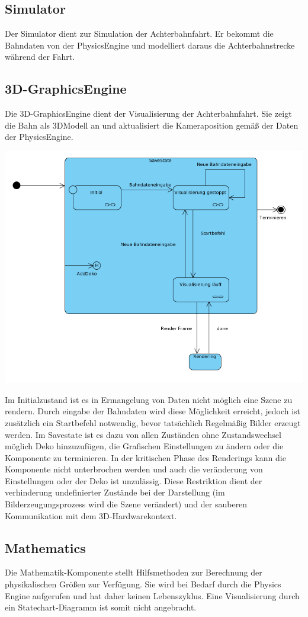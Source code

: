 \subsection{Simulator}
Der Simulator dient zur Simulation der Achterbahnfahrt. Er bekommt die Bahndaten von der PhysicsEngine und modelliert daraus die Achterbahnstrecke während der Fahrt.
\subsection{3D-GraphicsEngine}
Die 3D-GraphicsEngine dient der Visualisierung der Achterbahnfahrt. Sie zeigt die Bahn als 3DModell an und aktualisiert die Kameraposition gemäß der Daten der PhysicsEngine. 


\includegraphics[width=16cm]{bilder/statechart_3dgraphics}

Im Initialzustand ist es in Ermangelung von Daten nicht möglich eine Szene zu rendern. Durch eingabe der Bahndaten wird diese Möglichkeit erreicht, jedoch ist zusätzlich ein Startbefehl notwendig,
bevor tatsächlich Regelmäßig Bilder erzeugt werden. Im Savestate ist es dazu von allen Zuständen ohne Zustandswechsel möglich Deko hinzuzufügen, die Grafischen Einstellungen zu ändern oder die Komponente zu terminieren.
In der kritischen Phase des Renderings kann die Komponente nicht unterbrochen werden und auch die veränderung von Einstellungen oder der Deko ist unzulässig. Diese Restriktion dient der verhinderung undefinierter
Zustände bei der Darstellung (im Bilderzeugungsprozess wird die Szene verändert)  und der sauberen Kommunikation mit dem 3D-Hardwarekontext.

\subsection{Mathematics}
Die Mathematik-Komponente stellt Hilfsmethoden zur Berechnung der physikalischen Größen zur Verfügung. Sie wird bei Bedarf durch die Physics Engine aufgerufen und hat daher keinen Lebenszyklus. Eine Visualisierung durch ein Statechart-Diagramm ist somit nicht angebracht.